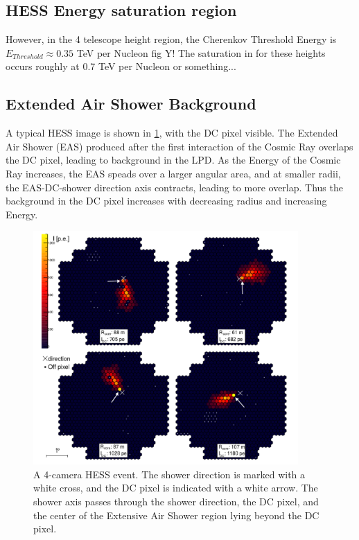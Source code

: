 \documentclass{article}
\begin{document}
\subsection{HESS Energy saturation region}
However, in the 4 telescope height region, the Cherenkov Threshold Energy is $ E_{Threshold} \approx 0.35$ TeV per Nucleon fig Y! The saturation in for these heights occurs roughly at 0.7 TeV per Nucleon or something...

\subsection{Extended Air Shower Background}
A typical HESS image is shown in \ref{fig:hess}, with the DC pixel visible. The Extended Air Shower (EAS) produced after the first interaction of the Cosmic Ray overlaps the DC pixel, leading to background in the LPD. As the Energy of the Cosmic Ray increases, the EAS speads over a larger angular area, and at smaller radii, the EAS-DC-shower direction axis contracts, leading to more overlap. Thus the background in the DC pixel increases with decreasing radius and increasing Energy. 

\begin{figure}
\begin{center}
\includegraphics[width=0.9\textwidth]{hess}
\caption{A 4-camera HESS event. The shower direction is marked with a white cross, and the DC pixel is indicated with a white arrow. The shower axis passes through the shower direction, the DC pixel, and the center of the Extensive Air Shower region lying beyond the DC pixel.}
\label{fig:hess}
\end{center}
\end{figure}
\end{document}
